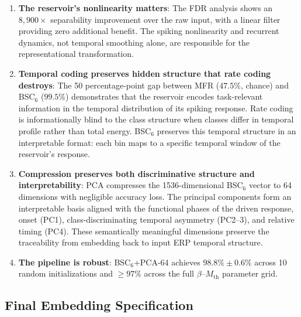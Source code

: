 \begin{enumerate}
    \item \textbf{The reservoir's nonlinearity matters}: The FDR analysis shows an $8{,}900\times$ separability improvement over the raw input, with a linear filter providing zero additional benefit. The spiking nonlinearity and recurrent dynamics, not temporal smoothing alone, are responsible for the representational transformation.

    \item \textbf{Temporal coding preserves hidden structure that rate coding destroys}: The 50 percentage-point gap between MFR ($47.5\%$, chance) and BSC$_6$ ($99.5\%$) demonstrates that the reservoir encodes task-relevant information in the temporal distribution of its spiking response. Rate coding is informationally blind to the class structure when classes differ in temporal profile rather than total energy. BSC$_6$ preserves this temporal structure in an interpretable format: each bin maps to a specific temporal window of the reservoir's response.

    \item \textbf{Compression preserves both discriminative structure and interpretability}: PCA compresses the 1536-dimensional BSC$_6$ vector to 64 dimensions with negligible accuracy loss. The principal components form an interpretable basis aligned with the functional phases of the driven response, onset (PC1), class-discriminating temporal asymmetry (PC2--3), and relative timing (PC4). These semantically meaningful dimensions preserve the traceability from embedding back to input ERP temporal structure.

    \item \textbf{The pipeline is robust}: BSC$_6$+PCA-64 achieves $98.8\% \pm 0.6\%$ across 10 random initializations and $\geq 97\%$ across the full $\beta$--$M_{\text{th}}$ parameter grid.
\end{enumerate}

\subsection{Final Embedding Specification}

